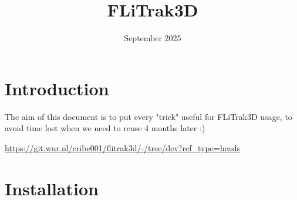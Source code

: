 \documentclass{article}
\title{FLiTrak3D}
\date{September 2025}
\begin{document}
\maketitle

\section{Introduction}


The aim of this document is to put every "trick" useful for FLiTrak3D usage, to avoid time lost when we need to reuse 4 months later :)



\url{https://git.wur.nl/cribe001/flitrak3d/-/tree/dev?ref_type=heads}





\section{Installation}
\end{document}
